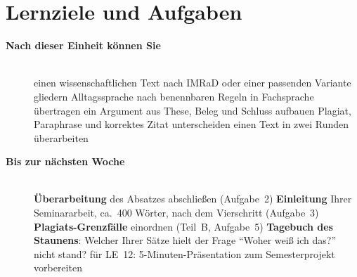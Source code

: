 \section{Lernziele und Aufgaben}
\begin{description}
\item[{\rot\bf Nach dieser Einheit können Sie}]~\\[-\lblskip]
\bi
  \ite einen wissenschaftlichen Text nach IMRaD oder einer passenden
    Variante gliedern
  \ite Alltagssprache nach benennbaren Regeln in Fachsprache übertragen
  \ite ein Argument aus These, Beleg und Schluss aufbauen
  \ite Plagiat, Paraphrase und korrektes Zitat unterscheiden
  \ite einen Text in zwei Runden überarbeiten
\ei
\os{\newpage}

\item[{\rot\bf Bis zur nächsten Woche}]~\\[-\lblskip]
\bi
  \ite \textbf{Überarbeitung} des Absatzes abschließen (Aufgabe~2)
  \ite \textbf{Einleitung} Ihrer Seminararbeit, ca.\ 400 Wörter, nach dem
    Vierschritt (Aufgabe~3)
  \ite \textbf{Plagiats-Grenzfälle} einordnen (Teil~B, Aufgabe~5)
  \ite \textbf{Tagebuch des Staunens}: Welcher Ihrer Sätze hielt der Frage
    \enquote{Woher weiß ich das?} nicht stand?
  \ite für LE~12: 5-Minuten-Präsentation zum Semesterprojekt vorbereiten
\ei
\os{\newpage}
\end{description}

